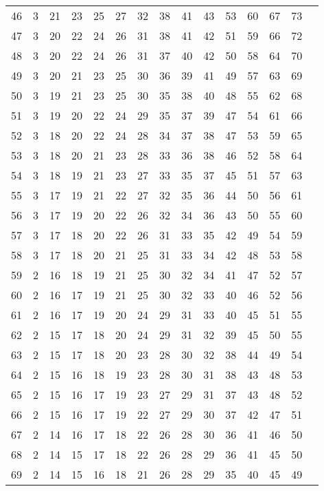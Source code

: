 \begin{scriptsize}
\begin{longtable}{c |c |c |c |c |c |c |c |c |c |c |c |c |c |c}
		46 & 3 & 21 & 23 & 25 & 27 & 32 & 38 & 41 & 43 & 53 & 60 & 67 & 73\\
		47 & 3 & 20 & 22 & 24 & 26 & 31 & 38 & 41 & 42 & 51 & 59 & 66 & 72\\
		48 & 3 & 20 & 22 & 24 & 26 & 31 & 37 & 40 & 42 & 50 & 58 & 64 & 70\\
		49 & 3 & 20 & 21 & 23 & 25 & 30 & 36 & 39 & 41 & 49 & 57 & 63 & 69\\
		50 & 3 & 19 & 21 & 23 & 25 & 30 & 35 & 38 & 40 & 48 & 55 & 62 & 68\\
		51 & 3 & 19 & 20 & 22 & 24 & 29 & 35 & 37 & 39 & 47 & 54 & 61 & 66\\
		52 & 3 & 18 & 20 & 22 & 24 & 28 & 34 & 37 & 38 & 47 & 53 & 59 & 65\\
		53 & 3 & 18 & 20 & 21 & 23 & 28 & 33 & 36 & 38 & 46 & 52 & 58 & 64\\
		54 & 3 & 18 & 19 & 21 & 23 & 27 & 33 & 35 & 37 & 45 & 51 & 57 & 63\\
		55 & 3 & 17 & 19 & 21 & 22 & 27 & 32 & 35 & 36 & 44 & 50 & 56 & 61\\
		56 & 3 & 17 & 19 & 20 & 22 & 26 & 32 & 34 & 36 & 43 & 50 & 55 & 60\\
		57 & 3 & 17 & 18 & 20 & 22 & 26 & 31 & 33 & 35 & 42 & 49 & 54 & 59\\
		58 & 3 & 17 & 18 & 20 & 21 & 25 & 31 & 33 & 34 & 42 & 48 & 53 & 58\\
		59 & 2 & 16 & 18 & 19 & 21 & 25 & 30 & 32 & 34 & 41 & 47 & 52 & 57\\
		60 & 2 & 16 & 17 & 19 & 21 & 25 & 30 & 32 & 33 & 40 & 46 & 52 & 56\\
		61 & 2 & 16 & 17 & 19 & 20 & 24 & 29 & 31 & 33 & 40 & 45 & 51 & 55\\
		62 & 2 & 15 & 17 & 18 & 20 & 24 & 29 & 31 & 32 & 39 & 45 & 50 & 55\\
		63 & 2 & 15 & 17 & 18 & 20 & 23 & 28 & 30 & 32 & 38 & 44 & 49 & 54\\
		64 & 2 & 15 & 16 & 18 & 19 & 23 & 28 & 30 & 31 & 38 & 43 & 48 & 53\\
		65 & 2 & 15 & 16 & 17 & 19 & 23 & 27 & 29 & 31 & 37 & 43 & 48 & 52\\
		66 & 2 & 15 & 16 & 17 & 19 & 22 & 27 & 29 & 30 & 37 & 42 & 47 & 51\\
		67 & 2 & 14 & 16 & 17 & 18 & 22 & 26 & 28 & 30 & 36 & 41 & 46 & 50\\
		68 & 2 & 14 & 15 & 17 & 18 & 22 & 26 & 28 & 29 & 36 & 41 & 45 & 50\\
		69 & 2 & 14 & 15 & 16 & 18 & 21 & 26 & 28 & 29 & 35 & 40 & 45 & 49\\

\end{longtable}
\end{scriptsize}
